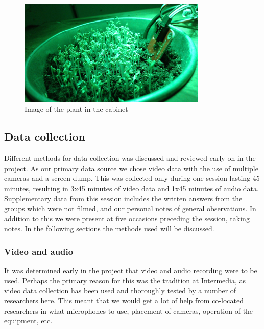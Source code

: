 \begin{figure}
\centering
\includegraphics[width=0.8\textwidth]{img/empiricalsetting/cupboardsystem.jpg}
\caption{Image of the plant in the cabinet}
\label{fig:cabinetsystemplant}
\end{figure}


\subsection{Data collection}
Different methods for data collection was discussed and reviewed early on in the project. As our primary data source we chose video data with the use of multiple cameras and a screen-dump. This was collected only during one session lasting 45 minutes, resulting in 3x45 minutes of video data and 1x45 minutes of audio data. Supplementary data from this session includes the written answers from the groups which were not filmed, and our personal notes of general observations. In addition to this we were present at five occasions preceding the session, taking notes. In the following sections the methods used will be discussed. 

\subsubsection{Video and audio}
It was determined early in the project that video and audio recording were to be used. Perhaps the primary reason for this was the tradition at Intermedia, as video data collection has been used and thoroughly tested by a number of researchers here. This meant that we would get a lot of help from co-located researchers in what microphones to use, placement of cameras, operation of the equipment, etc. 

